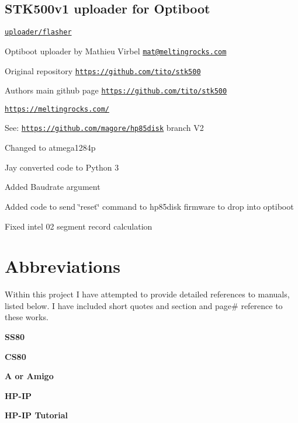 \subsection*{S\+T\+K500v1 uploader for Optiboot}


\begin{DoxyItemize}
\item \href{uploader/flasher}{\tt uploader/flasher}
\begin{DoxyItemize}
\item Optiboot uploader by Mathieu Virbel \href{mailto:mat@meltingrocks.com}{\tt mat@meltingrocks.\+com}
\begin{DoxyItemize}
\item Original repository \href{https://github.com/tito/stk500}{\tt https\+://github.\+com/tito/stk500}
\begin{DoxyItemize}
\item Authors main github page \href{https://github.com/tito/stk500}{\tt https\+://github.\+com/tito/stk500}
\begin{DoxyItemize}
\item \href{https://meltingrocks.com/}{\tt https\+://meltingrocks.\+com/}
\end{DoxyItemize}
\end{DoxyItemize}
\end{DoxyItemize}
\end{DoxyItemize}
\end{DoxyItemize}

See\+: \href{https://github.com/magore/hp85disk}{\tt https\+://github.\+com/magore/hp85disk} branch V2
\begin{DoxyItemize}
\item Changed to atmega1284p
\item Jay converted code to Python 3
\item Added Baudrate argument
\item Added code to send \char`\"{}reset\char`\"{} command to hp85disk firmware to drop into optiboot
\item Fixed intel 02 segment record calculation
\end{DoxyItemize}





\section*{Abbreviations}

Within this project I have attempted to provide detailed references to manuals, listed below. I have included short quotes and section and page\# reference to these works.
\begin{DoxyItemize}
\item {\bfseries S\+S80}
\item {\bfseries C\+S80}
\item {\bfseries A or Amigo}
\item {\bfseries H\+P-\/\+IP}
\item {\bfseries H\+P-\/\+IP Tutorial}
\end{DoxyItemize}



